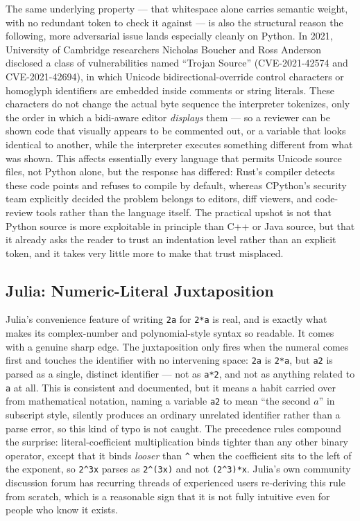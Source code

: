 The same underlying property --- that whitespace alone carries semantic weight, with no redundant token to check it against --- is also the structural reason the following, more adversarial issue lands especially cleanly on Python. In 2021, University of Cambridge researchers Nicholas Boucher and Ross Anderson disclosed a class of vulnerabilities named ``Trojan Source'' (CVE-2021-42574 and CVE-2021-42694), in which Unicode bidirectional-override control characters or homoglyph identifiers are embedded inside comments or string literals. These characters do not change the actual byte sequence the interpreter tokenizes, only the order in which a bidi-aware editor \emph{displays} them --- so a reviewer can be shown code that visually appears to be commented out, or a variable that looks identical to another, while the interpreter executes something different from what was shown. This affects essentially every language that permits Unicode source files, not Python alone, but the response has differed: Rust's compiler detects these code points and refuses to compile by default, whereas CPython's security team explicitly decided the problem belongs to editors, diff viewers, and code-review tools rather than the language itself. The practical upshot is not that Python source is more exploitable in principle than C++ or Java source, but that it already asks the reader to trust an indentation level rather than an explicit token, and it takes very little more to make that trust misplaced.

\subsection{Julia: Numeric-Literal Juxtaposition}

Julia's convenience feature of writing \verb|2a| for \verb|2*a| is real, and is exactly what makes its complex-number and polynomial-style syntax so readable. It comes with a genuine sharp edge. The juxtaposition only fires when the numeral comes first and touches the identifier with no intervening space: \verb|2a| is \verb|2*a|, but \verb|a2| is parsed as a single, distinct identifier --- not as \verb|a*2|, and not as anything related to \verb|a| at all. This is consistent and documented, but it means a habit carried over from mathematical notation, naming a variable \verb|a2| to mean ``the second $a$'' in subscript style, silently produces an ordinary unrelated identifier rather than a parse error, so this kind of typo is not caught. The precedence rules compound the surprise: literal-coefficient multiplication binds tighter than any other binary operator, except that it binds \emph{looser} than \verb|^| when the coefficient sits to the left of the exponent, so \verb|2^3x| parses as \verb|2^(3x)| and not \verb|(2^3)*x|. Julia's own community discussion forum has recurring threads of experienced users re-deriving this rule from scratch, which is a reasonable sign that it is not fully intuitive even for people who know it exists.

